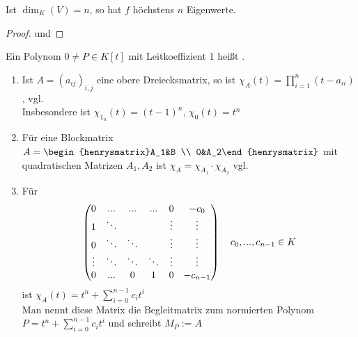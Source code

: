 \begin{conclusion}
	Ist $\dim_K(V)=n$, so hat $f$ höchstens $n$ Eigenwerte.
\end{conclusion}
\begin{proof}
	 und 
\end{proof}

\begin{definition}
	Ein Polynom $0\neq P\in K[t]$ mit Leitkoeffizient 1 heißt .
\end{definition}

\begin{example}
	\begin{enumerate}
		\item Ist $A=(a_{ij})_{i,j}$ eine obere Dreiecksmatrix, so ist $\chi_A(t)=\prod_{i=1}^n (t-a_{ii})$, vgl.  \\
		Insbesondere ist $\chi_{1_n}(t)=(t-1)^n$, $\chi_0(t)=t^n$
		\item Für eine Blockmatrix $A=\begin{henrysmatrix}A_1&B \\ 0&A_2\end{henrysmatrix}$ mit quadratischen Matrizen $A_1,A_2$ ist $\chi_A=\chi_{A_1}\cdot \chi_{A_2}$ vgl. 
		\item Für
		\begin{align}
			\begin{pmatrix}
			0&...&...&...&0&-c_0  \\ 
			1& \ddots&\;&\;&\vdots&\vdots  \\ 
			0&\ddots&\ddots&\;&\vdots&\vdots  \\ 
			\vdots&\ddots&\ddots&\ddots&\vdots&\vdots  \\ 
			0&...&0&1&0&-c_{n-1} 
			\end{pmatrix} \quad c_0,...,c_{n-1}\in K \notag
		\end{align}
		ist $\chi_A(t)=t^n+\sum_{i=0}^{n-1} c_i t^i$ \\
		Man nennt diese Matrix die Begleitmatrix zum normierten Polynom $P=t^n+\sum_{i=0}^{n-1} c_i t^i$ und schreibt $M_P:=A$
	\end{enumerate}
\end{example}